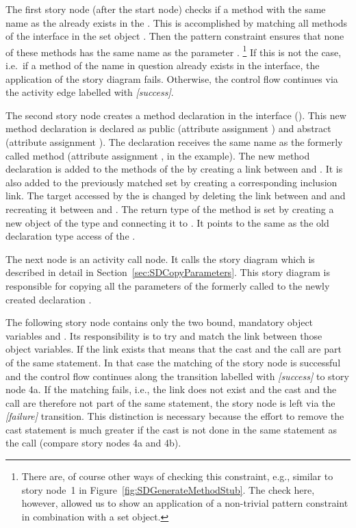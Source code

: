 The first story node (after the start node) checks if a method with the same name as the  already exists in the .
This is accomplished by matching all methods of the interface in the set object .
Then the pattern constraint ensures that none of these methods has the same name as the parameter . \footnote{There are, of course other ways of checking this constraint, e.g., similar to story node~1 in Figure~\ref{fig:SDGenerateMethodStub}. The check here, however, allowed us to show an application of a non-trivial pattern constraint in combination with a set object.}
If this is not the case, i.e.\ if a method of the name in question already exists in the interface, the application of the story diagram fails.
Otherwise, the control flow continues via the activity edge labelled with \emph{[success]}.

The second story node creates a method declaration in the interface (). This new method declaration is declared as public (attribute assignment ) and abstract (attribute assignment ). The declaration receives the same name as the formerly called method (attribute assignment ,  in the example). The new method declaration is added to the methods of the  by creating a  link between  and . It is also added to the previously matched set  by creating a corresponding inclusion link. The target accessed by the  is changed by deleting the link between  and  and recreating it between  and . The return type of the method is set by creating a new object  of the type  and connecting it to . It points to the same  as the old declaration type access of the .

The next node is an activity call node. It calls the story diagram  which is described in detail in Section~\ref{sec:SDCopyParameters}. This story diagram is responsible for copying all the parameters of the formerly called  to the newly created declaration .

The following story node contains only the two bound, mandatory object variables  and . Its responsibility is to try and match the link  between those object variables. If the link exists that means that the cast and the call are part of the same statement. In that case the matching of the story node is successful and the control flow continues along the transition labelled with \emph{[success]} to story node 4a. If the matching fails, i.e., the link does not exist and the cast and the call are therefore not part of the same statement, the story node is left via the \emph{[failure]} transition. This distinction is necessary because the effort to remove the cast statement is much greater if the cast is not done in the same statement as the call (compare story nodes 4a and 4b).

